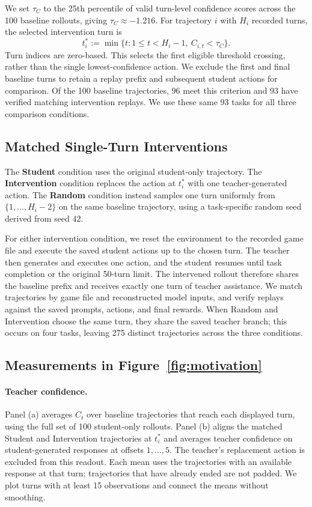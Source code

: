 We set $\tau_C$ to the 25th percentile of valid turn-level confidence scores
across the 100 baseline rollouts, giving $\tau_C\approx-1.216$. For trajectory
$i$ with $H_i$ recorded turns, the selected intervention turn is
\begin{equation}
t_i^* := \min\{t:1\le t<H_i-1,\ C_{i,t}<\tau_C\}.
\label{eq:app_motivation_trigger}
\end{equation}
Turn indices are zero-based. This selects the first eligible threshold crossing,
rather than the single lowest-confidence action. We exclude the first and final
baseline turns to retain a replay prefix and subsequent student actions for
comparison. Of the 100 baseline trajectories, 96 meet this criterion and 93 have
verified matching intervention replays. We use these same 93 tasks for all
three comparison conditions.

\subsection{Matched Single-Turn Interventions}

The \textbf{Student} condition uses the original student-only trajectory.
The \textbf{Intervention} condition replaces the action at $t_i^*$ with one
teacher-generated action. The \textbf{Random} condition instead samples one
turn uniformly from $\{1,\ldots,H_i-2\}$ on the same baseline trajectory,
using a task-specific random seed derived from seed 42.

For either intervention condition, we reset the environment to the recorded game
file and execute the saved student actions up to the chosen turn. The teacher
then generates and executes one action, and the student resumes until task
completion or the original 50-turn limit. The intervened rollout therefore
shares the baseline prefix and receives exactly one turn of teacher assistance.
We match trajectories by game file and reconstructed model inputs, and verify
replays against the saved prompts, actions, and final rewards. When Random and
Intervention choose the same turn, they share the saved teacher branch; this
occurs on four tasks, leaving 275 distinct trajectories across the three
conditions.

\subsection{Measurements in Figure~\ref{fig:motivation}}

\paragraph{Teacher confidence.}
Panel (a) averages $C_t$ over baseline trajectories that reach each displayed
turn, using the full set of 100 student-only rollouts. Panel (b) aligns the
matched Student and Intervention trajectories at $t_i^*$ and averages teacher
confidence on student-generated responses at offsets $1,\ldots,5$. The teacher's
replacement action is excluded from this readout. Each mean uses the trajectories
with an available response at that turn; trajectories that have already ended
are not padded. We plot turns with at least 15 observations and connect the
means without smoothing.

